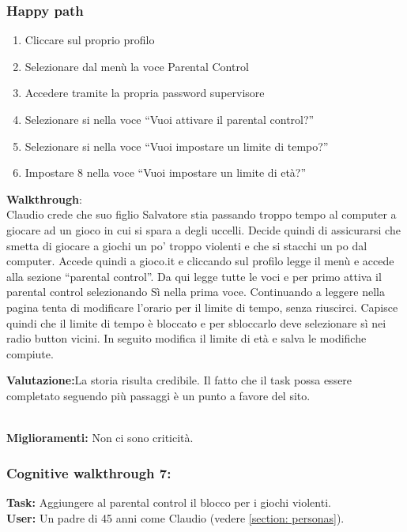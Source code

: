 \documentclass[../Report.tex]{subfiles}
\begin{document}
    \subsubsection{Happy path}
    \begin{enumerate}
        \item Cliccare sul proprio profilo
        \item Selezionare dal menù la voce Parental Control
        \item Accedere tramite la propria password supervisore
        \item         Selezionare si nella voce “Vuoi attivare il parental control?”
        \item Selezionare si nella voce “Vuoi impostare un limite di tempo?”
        \item Impostare 8 nella voce “Vuoi impostare un limite di età?”
    \end{enumerate}
    \textbf{Walkthrough}:\\
    Claudio crede che suo figlio Salvatore stia passando troppo tempo al computer a giocare ad un gioco in cui si spara a degli uccelli. Decide quindi di assicurarsi che smetta di giocare a giochi un po’ troppo violenti e che si stacchi un po dal computer. Accede quindi a gioco.it e cliccando sul profilo legge il menù e accede alla sezione “parental control”. Da qui legge tutte le voci e per primo attiva il parental control selezionando Sì nella prima voce. Continuando a leggere nella pagina tenta di modificare l’orario per il limite di tempo, senza riuscirci. Capisce quindi che il limite di tempo è bloccato e per sbloccarlo deve selezionare sì nei radio button vicini. In seguito modifica il limite di età e salva le modifiche compiute.  


    \textbf{Valutazione:}La storia risulta credibile. Il fatto che il task possa essere completato seguendo più passaggi è un punto a favore del sito.

    \\
    \textbf{Miglioramenti:} Non ci sono criticità.

    \subsubsection{Cognitive walkthrough 7:}
    \textbf{Task:} Aggiungere al parental control il blocco per i giochi violenti.\\
    \textbf{User:} Un padre di 45 anni come Claudio (vedere \ref{section: personas}).\\
\end{document}
